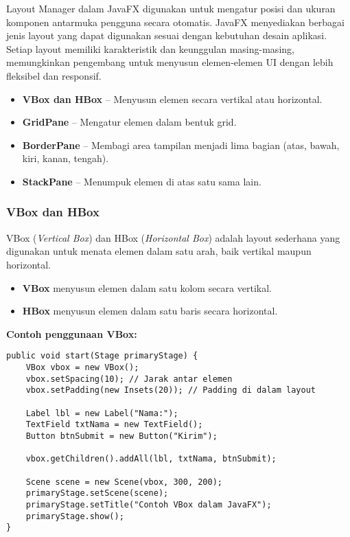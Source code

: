 Layout Manager dalam JavaFX digunakan untuk mengatur posisi dan ukuran komponen antarmuka pengguna secara otomatis. JavaFX menyediakan berbagai jenis layout yang dapat digunakan sesuai dengan kebutuhan desain aplikasi. Setiap layout memiliki karakteristik dan keunggulan masing-masing, memungkinkan pengembang untuk menyusun elemen-elemen UI dengan lebih fleksibel dan responsif.

\begin{itemize}
\item \textbf{VBox dan HBox} – Menyusun elemen secara vertikal atau horizontal.
\item \textbf{GridPane} – Mengatur elemen dalam bentuk grid.
\item \textbf{BorderPane} – Membagi area tampilan menjadi lima bagian (atas, bawah, kiri, kanan, tengah).
\item \textbf{StackPane} – Menumpuk elemen di atas satu sama lain.
\end{itemize}

\subsubsection{VBox dan HBox}

VBox (\textit{Vertical Box}) dan HBox (\textit{Horizontal Box}) adalah layout sederhana yang digunakan untuk menata elemen dalam satu arah, baik vertikal maupun horizontal.

\begin{itemize}
\item \textbf{VBox} menyusun elemen dalam satu kolom secara vertikal.
\item \textbf{HBox} menyusun elemen dalam satu baris secara horizontal.
\end{itemize}

\textbf{Contoh penggunaan VBox:}
\begin{lstlisting}[style=JavaStyle, caption=Menyusun elemen dalam VBox]
public void start(Stage primaryStage) {
	VBox vbox = new VBox();
	vbox.setSpacing(10); // Jarak antar elemen
	vbox.setPadding(new Insets(20)); // Padding di dalam layout
	
	Label lbl = new Label("Nama:");
	TextField txtNama = new TextField();
	Button btnSubmit = new Button("Kirim");
	
	vbox.getChildren().addAll(lbl, txtNama, btnSubmit);
	
	Scene scene = new Scene(vbox, 300, 200);
	primaryStage.setScene(scene);
	primaryStage.setTitle("Contoh VBox dalam JavaFX");
	primaryStage.show();
}
\end{lstlisting}


